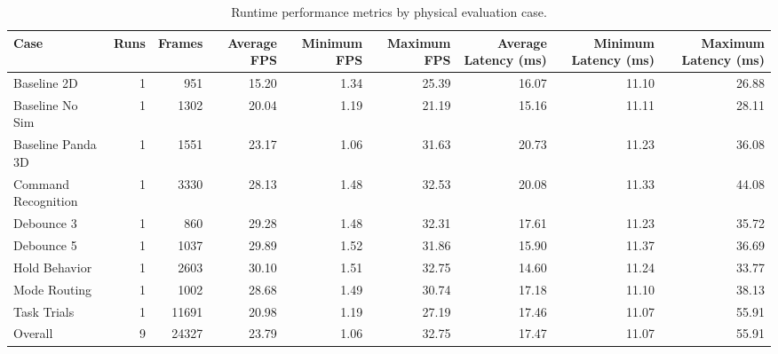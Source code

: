 \begin{table}[htbp]
\centering
\caption{Runtime performance metrics by physical evaluation case.}
\label{tab:runtime-performance}
\begin{tabular}{lrrrrrrrr}
\toprule
Case & Runs & Frames & Average FPS & Minimum FPS & Maximum FPS & Average Latency (ms) & Minimum Latency (ms) & Maximum Latency (ms) \\
\midrule
Baseline 2D & 1 & 951 & 15.20 & 1.34 & 25.39 & 16.07 & 11.10 & 26.88 \\
Baseline No Sim & 1 & 1302 & 20.04 & 1.19 & 21.19 & 15.16 & 11.11 & 28.11 \\
Baseline Panda 3D & 1 & 1551 & 23.17 & 1.06 & 31.63 & 20.73 & 11.23 & 36.08 \\
Command Recognition & 1 & 3330 & 28.13 & 1.48 & 32.53 & 20.08 & 11.33 & 44.08 \\
Debounce 3 & 1 & 860 & 29.28 & 1.48 & 32.31 & 17.61 & 11.23 & 35.72 \\
Debounce 5 & 1 & 1037 & 29.89 & 1.52 & 31.86 & 15.90 & 11.37 & 36.69 \\
Hold Behavior & 1 & 2603 & 30.10 & 1.51 & 32.75 & 14.60 & 11.24 & 33.77 \\
Mode Routing & 1 & 1002 & 28.68 & 1.49 & 30.74 & 17.18 & 11.10 & 38.13 \\
Task Trials & 1 & 11691 & 20.98 & 1.19 & 27.19 & 17.46 & 11.07 & 55.91 \\
Overall & 9 & 24327 & 23.79 & 1.06 & 32.75 & 17.47 & 11.07 & 55.91 \\
\bottomrule
\end{tabular}
\end{table}

